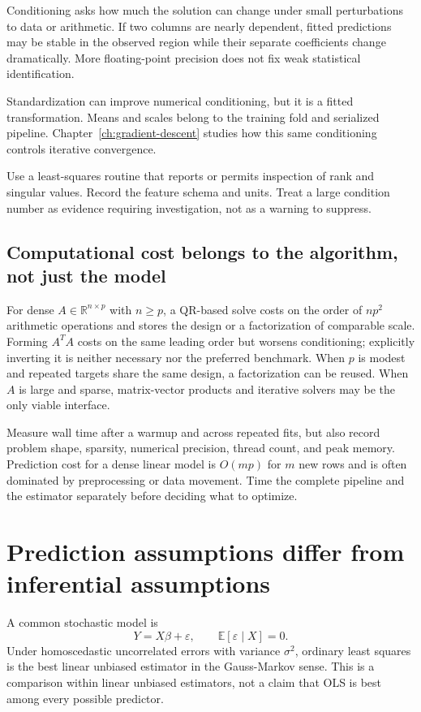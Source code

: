 Conditioning asks how much the solution can change under small perturbations to
data or arithmetic. If two columns are nearly dependent, fitted predictions may
be stable in the observed region while their separate coefficients change
dramatically. More floating-point precision does not fix weak statistical
identification.

Standardization can improve numerical conditioning, but it is a fitted
transformation. Means and scales belong to the training fold and serialized
pipeline. Chapter~\ref{ch:gradient-descent} studies how this same conditioning
controls iterative convergence.

\begin{professionalbox}
Use a least-squares routine that reports or permits inspection of rank and
singular values. Record the feature schema and units. Treat a large condition
number as evidence requiring investigation, not as a warning to suppress.
\end{professionalbox}

\subsection{Computational cost belongs to the algorithm, not just the model}

For dense $A\in\mathbb{R}^{n\times p}$ with $n\ge p$, a QR-based solve costs
on the order of $np^2$ arithmetic operations and stores the design or a
factorization of comparable scale. Forming $A^TA$ costs on the same leading
order but worsens conditioning; explicitly inverting it is neither necessary
nor the preferred benchmark. When $p$ is modest and repeated targets share the
same design, a factorization can be reused. When $A$ is large and sparse,
matrix-vector products and iterative solvers may be the only viable interface.

Measure wall time after a warmup and across repeated fits, but also record
problem shape, sparsity, numerical precision, thread count, and peak memory.
Prediction cost for a dense linear model is $O(mp)$ for $m$ new rows and is
often dominated by preprocessing or data movement. Time the complete pipeline
and the estimator separately before deciding what to optimize.

\section{Prediction assumptions differ from inferential assumptions}

A common stochastic model is
\[
Y=X\beta+\varepsilon,
\qquad \mathbb{E}[\varepsilon\mid X]=0.
\]
Under homoscedastic uncorrelated errors with variance $\sigma^2$, ordinary least
squares is the best linear unbiased estimator in the Gauss-Markov sense. This
is a comparison within linear unbiased estimators, not a claim that OLS is best
among every possible predictor.

